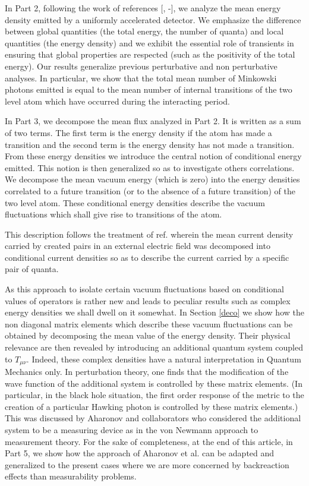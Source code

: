 \documentclass[12pt]{article}
\begin{document}
In Part 2,
following the work of references
[, -],
we analyze the mean energy density emitted by a uniformly
accelerated detector.
We
emphasize
the difference between global quantities (the total energy, the number of
quanta) and local quantities (the energy density) and we exhibit the essential
role of transients in ensuring that global properties are respected
(such as the positivity of the total energy).
Our results generalize previous perturbative\cite{AM} and
non perturbative\cite{Unru2} analyses. In particular, we  show that the
total mean number of Minkowski photons emitted is equal to the mean number of
internal transitions of the two level atom which have occurred during
the interacting period.

In Part 3, we decompose the mean flux analyzed in Part 2.
 It is written as a sum of two terms\cite{UnWa,Grove,AM}.
The first term is the energy density  if the atom has made a transition
and the second term is the energy density has not
made a transition. From these energy densities we introduce the central notion
of  conditional
energy emitted. This notion is then generalized so as to investigate others
correlations.
We
decompose the mean vacuum energy (which is zero) into the energy densities
correlated to a future transition (or to the absence of a future transition)
of the two level atom.
These conditional
energy densities describe the vacuum fluctuations
which shall give rise to transitions of the atom.

This description follows the treatment
of ref. \cite{bmpps}
 wherein the mean current density carried by created pairs in an
external electric field was decomposed into conditional current densities
so as to describe the current carried by a specific pair of quanta.

As this approach to isolate certain
vacuum fluctuations based on
conditional values of operators
is
rather new
and leads to
peculiar
results such as
complex energy densities
we shall dwell on it somewhat. In
Section \ref{deco} we show how the non diagonal matrix elements which
describe these vacuum fluctuations can be obtained by decomposing the mean
value of the energy density.
Their
physical relevance are then revealed by introducing an additional quantum
system coupled to $T_{\mu\nu}$. Indeed, these complex densities
have a natural interpretation in Quantum Mechanics only.
In perturbation theory, one finds that the modification of the
wave function of the additional system is controlled by these matrix elements.
(In particular, in
the black hole situation, the first order response of the metric to the
creation of a particular Hawking photon is controlled by these
matrix elements.)
This was discussed
by Aharonov and collaborators\cite{aharo} who considered the additional
system to be a measuring device as in the von Newmann approach to measurement
theory\cite{Vonn}. For the sake of completeness, at
the end of this article, in Part 5, we show how
the approach of Aharonov et al. can be adapted and
generalized to the present cases where we are more concerned
by backreaction effects than measurability problems.
\end{document}
